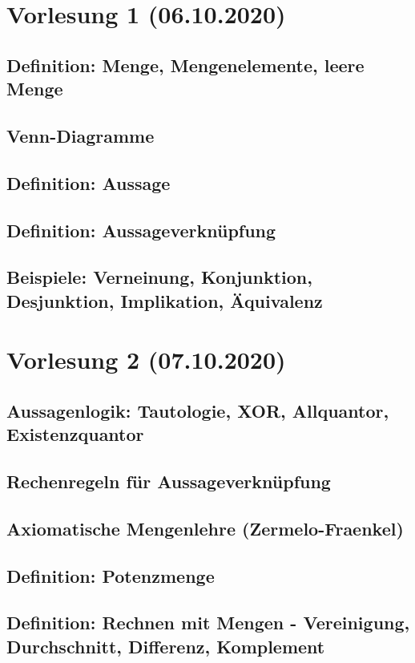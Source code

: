 \documentclass[]{article}
\begin{document}
\tableofcontents
{}
\pagebreak
\section{Vorlesung 1 (06.10.2020)}
\subsection{Definition: Menge, Mengenelemente, leere Menge}
\subsection{Venn-Diagramme}
\subsection{Definition: Aussage}
\subsection{Definition: Aussageverknüpfung}
\subsection{Beispiele: Verneinung, Konjunktion, Desjunktion, Implikation, Äquivalenz}


\section{Vorlesung 2 (07.10.2020)}
\subsection{Aussagenlogik: Tautologie, XOR, Allquantor, Existenzquantor}
\subsection{Rechenregeln für Aussageverknüpfung}
\subsection{Axiomatische Mengenlehre (Zermelo-Fraenkel)}
\subsection{Definition: Potenzmenge}
\subsection{Definition: Rechnen mit Mengen - Vereinigung, Durchschnitt, Differenz, Komplement}

\end{document}
